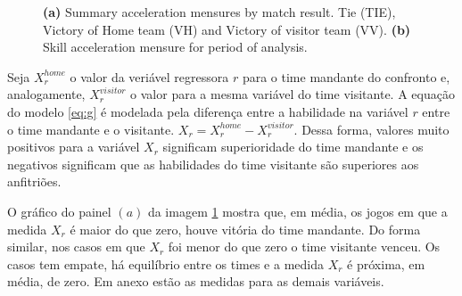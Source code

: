 \documentclass[review]{elsarticle}
\begin{document}
\begin{figure}%
    \centering
    \qquad
    \caption[\scriptsize{Summary acceleration mensure.}]{\scriptsize{ \textbf{(a)} Summary acceleration mensures by match result. Tie (TIE), Victory of Home team (VH) and Victory of visitor team (VV). \textbf{(b)} Skill acceleration mensure for period of analysis. }}
    \label{fig:summary}%
\end{figure}


Seja $X^{home}_{r}$ o valor da veriável regressora $r$ para o time mandante do confronto e, analogamente, $X^{visitor}_{r}$ o valor para a mesma variável do time visitante. A equação do modelo \ref{eq:g} é modelada pela diferença entre a habilidade na variável $r$ entre o time mandante e o visitante. $X_{r} = X^{home}_{r}-X^{visitor}_{r}$. Dessa forma, valores muito positivos para a variável $X_{r}$ significam superioridade do time mandante e os negativos significam que as habilidades do time visitante são superiores aos anfitriões.


O gráfico do painel $(a)$ da imagem \ref{fig:summary} mostra que, em média, os jogos em que a medida $X_r$ é maior do que zero, houve vitória do time mandante. Do forma similar, nos casos em que $X_r$ foi menor do que zero o time visitante venceu. Os casos tem empate, há equilíbrio entre os times e a medida $X_r$ é próxima, em média, de zero. Em anexo estão as medidas para as demais variáveis.
\end{document}
